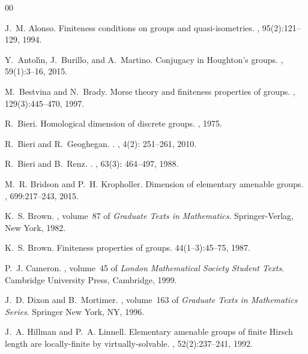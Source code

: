 \documentclass[11pt,a4paper]{amsart}
\theoremstyle{definition}
\theoremstyle{remark}
\begin{document}
\begin{thebibliography}{00}

J.~M. Alonso.
\newblock Finiteness conditions on groups and quasi-isometries.
, 95(2):121--129, 1994.

Y.~Antol{\'{\i}}n, J.~Burillo, and A.~Martino.
\newblock Conjugacy in {H}oughton's groups.
, 59(1):3--16, 2015.

M.~Bestvina and N.~Brady.
\newblock Morse theory and finiteness properties of groups.
, 129(3):445--470, 1997.


R.~Bieri.
\newblock Homological dimension of discrete groups.
, 1975.

R.~Bieri and R.~Geoghegan.
.
, 4(2): 251--261, 2010.

R.~Bieri and B.~Renz.
.
, 63(3): 464--497, 1988.


M.~R. Bridson and P.~H. Kropholler.
\newblock Dimension of elementary amenable groups.
, 699:217--243, 2015.

K.~S. Brown.
, volume~87 of {\em Graduate Texts in
  Mathematics}.
\newblock Springer-Verlag, New York, 1982.

K.~S. Brown.
\newblock Finiteness properties of groups.
 44(1--3):45--75, 1987.

P.~J. Cameron.
, volume~45 of {\em London Mathematical
  Society Student Texts}.
\newblock Cambridge University Press, Cambridge, 1999.

J.~D. Dixon and B.~Mortimer.
, volume~163 of {\em Graduate Texts in Mathematics Series}.
\newblock Springer New York, NY, 1996.

J.~A. Hillman and P.~A. Linnell.
\newblock Elementary amenable groups of finite {H}irsch length are
  locally-finite by virtually-solvable.
, 52(2):237--241, 1992.


\end{thebibliography}
\end{document}
